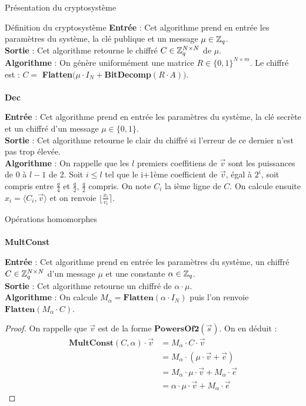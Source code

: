 \begin{section}{Présentation du cryptosystème}
\begin{subsection}{Définition du cryptosystème}
	\textbf{Entrée} : Cet algorithme prend en entrée les paramètres du système, la clé publique et un message $\mu \in \mathbb{Z}_q$. \\
	\textbf{Sortie} : Cet algorithme retourne le chiffré $C \in \mathbb{Z}_q^{N \times N}$ de $\mu$.\\
	\textbf{Algorithme} : On génère uniformément une matrice $R \in \{ 0,1\} ^{N \times m}$. Le chiffré est : $C = $ \textbf{Flatten}$(\mu \cdot I_N + $\textbf{BitDecomp}$(R \cdot A))$.
	
	\paragraph{}
	\textbf{Dec}
	\flushleft
	
	\textbf{Entrée} : Cet algorithme prend en entrée les paramètres du système, la clé secrète et un chiffré d'un message $\mu \in \{ 0,1\} $. \\
	\textbf{Sortie} : Cet algorithme retourne le clair du chiffré si l'erreur de ce dernier n'est pas trop élevée.\\
	\textbf{Algorithme} : On rappelle que les $l$ premiers coeffitiens de $\vec{v}$ sont les puissances de 0 à $l-1$ de 2. Soit $i \leqslant l$ tel que le i+1ème coefficient de $\vec{v}$, égal à $2^{i}$, soit compris entre $\frac{q}{4}$ et $\frac{q}{2}$, $\frac{q}{2}$ compris. On note $C_i$ la ième ligne de $C$. On calcule ensuite $x_i = \langle C_i, \vec{v} \rangle$ et on renvoie $\lfloor \frac{x_i}{v_i} \rceil$.
	\end{subsection}
	
	\begin{subsection}{Opérations homomorphes}
	
	\paragraph{}
	\textbf{MultConst}
	\flushleft
	
	\textbf{Entrée} : Cet algorithme prend en entrée les paramètres du système, un chiffré $C \in \mathbb{Z}_q^{N \times N}$ d'un message $\mu$ et une constante $\alpha \in \mathbb{Z}_q$. \\
	\textbf{Sortie} : Cet algorithme retourne un chiffré de $\alpha \cdot \mu$.\\
	\textbf{Algorithme} : On calcule $M_{\alpha} = \textbf{Flatten}(\alpha \cdot I_N)$ puis l'on renvoie $\textbf{Flatten}(M_{\alpha} \cdot C)$.
	\begin{proof}
	On rappelle que $\vec{v}$ est de la forme $\textbf{PowersOf2}(\vec{s})$. On en déduit :
	\begin{align*}
	\textbf{MultConst}(C, \alpha) \cdot \vec{v} &= M_{\alpha} \cdot C \cdot \vec{v} \\
	&= M_{\alpha} \cdot (\mu \cdot \vec{v} + \vec{e}) \\
	&= M_{\alpha} \cdot \mu \cdot \vec{v} + M_{\alpha} \cdot \vec{e} \\
	&= \alpha \cdot \mu \cdot \vec{v} + M_{\alpha} \cdot \vec{e}
	\end{align*}
	\end{proof}
	

\end{subsection}
\end{section}
